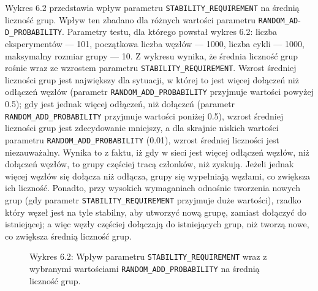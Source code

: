 \documentclass[12pt, twoside, openany]{report}
\begin{document}
Wykres 6.2 przedstawia wpływ parametru \texttt{STABILITY\_REQUIREMENT} na średnią liczność grup. Wpływ ten zbadano dla różnych wartości parametru \texttt{RANDOM\_AD}-\texttt{D\_PROBABILITY}. Parametry testu, dla którego powstał wykres 6.2: liczba eksperymentów --- 101, początkowa liczba węzłów --- 1000, liczba cykli --- 1000, maksymalny rozmiar grupy --- 10. Z wykresu wynika, że średnia liczność grup rośnie wraz ze wzrostem parametru \texttt{STABILITY\_REQUIREMENT}. Wzrost średniej liczności grup jest największy dla sytuacji, w której to jest więcej dołączeń niż odłączeń węzłów (parametr \texttt{RANDOM\_ADD\_PROBABILITY} przyjmuje wartości powyżej 0.5); gdy jest jednak więcej odłączeń, niż dołączeń (parametr \texttt{RANDOM\_ADD\_PROBABILITY} przyjmuje wartości poniżej 0.5), wzrost średniej liczności grup jest zdecydowanie mniejszy, a dla skrajnie niskich wartości parametru \texttt{RANDOM\_ADD\_PROBABILITY} (0.01), wzrost średniej liczności jest niezauważalny. Wynika to z faktu, iż gdy w sieci jest więcej odłączeń węzłów, niż dołączeń węzłów, to grupy częściej tracą członków, niż zyskują. Jeżeli jednak więcej węzłów się dołącza niż odłącza, grupy się wypełniają węzłami, co zwiększa ich liczność. Ponadto, przy wysokich wymaganiach odnośnie tworzenia nowych grup (gdy parametr \texttt{STABILITY\_REQUIREMENT} przyjmuje duże wartości), rzadko który węzeł jest na tyle stabilny, aby utworzyć nową grupę, zamiast dołączyć do istniejącej; a więc węzły częściej dołączają do istniejących grup, niż tworzą nowe, co zwiększa średnią liczność grup.

\begin{figure}[H]
\captionsetup{labelformat=empty}
\caption{Wykres 6.2: Wpływ parametru \texttt{STABILITY\_REQUIREMENT} wraz z wybranymi wartościami \texttt{RANDOM\_ADD\_PROBABILITY} na średnią liczność grup.}
\end{figure}
\end{document}
